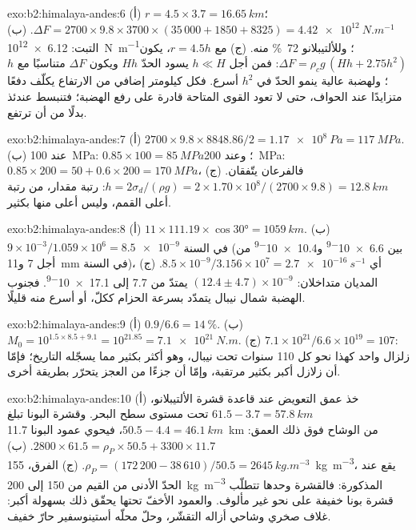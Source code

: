 \begin{solution}{exo:b2:himalaya-andes:6}
(أ) $r = 4.5\times3.7 = \qty{16.65}{km}$؛ $\Delta F = 2700\times9.8\times3700\times(35\,000 +
1850 + 8325) = \qty{4.42e12}{N.m^{-1}}$. (ب) التبت: \qty{6.12e12}{N.m^{-1}}؛ وللألتيبلانو
\qty{72}{\percent} منه. (ج) مع $r = 4.5h$، يكون $\Delta F = \rho_c g\,(Hh + 2.75h^2)$: فمن أجل
$h \ll H$ يسود الحدّ $Hh$ ويكون $\Delta F$ متناسبًا مع $h$؛ ولهضبة عالية
ينمو الحدّ في $h^2$ أسرع. فكل كيلومتر إضافي من الارتفاع يكلّف دفعًا متزايدًا عند
الحواف، حتى لا تعود القوى المتاحة قادرة على رفع الهضبة؛ فتنبسط عندئذ
بدلًا من أن ترتفع.
\end{solution}

\begin{solution}{exo:b2:himalaya-andes:7}
(أ) $2700\times9.8\times8848.86/2 = \qty{1.17e8}{Pa} = \qty{117}{MPa}$. (ب) عند
\qty{100}{MPa}: $0.85\times100 = \qty{85}{MPa}$؛ وعند \qty{200}{MPa}: $0.85\times200 = 50 +
0.6\times200 = \qty{170}{MPa}$، فالفرعان يتّفقان. (ج) $h = 2\sigma_d/(\rho g) =
2\times1.70\times10^8/(2700\times9.8) = \qty{12.8}{km}$: رتبة مقدار، من رتبة
أعلى القمم، وليس أعلى منها بكثير.
\end{solution}

\begin{solution}{exo:b2:himalaya-andes:8}
(أ) $11\times111.19\times\cos\ang{30} = \qty{1059}{km}$. (ب) $9\times10^{-3}/1.059\times10^{6}
= \num{8.5e-9}$ في السنة (بين \num{6.6e-9} و\num{10.4e-9} من أجل 7 و\qty{11}{mm} في السنة)،
أي $8.5\times10^{-9}/3.156\times10^{7} = \qty{2.7e-16}{s^{-1}}$. (ج) المديان
متداخلان: $(12.4 \pm 4.7) \times 10^{-9}$ يمتدّ من 7.7 إلى \num{17.1e-9}. فجنوب الهضبة شمال
نيبال يتمدّد بسرعة الحزام ككلّ، أو أسرع منه قليلًا.
\end{solution}

\begin{solution}{exo:b2:himalaya-andes:9}
(أ) $0.9/6.6 = \qty{14}{\percent}$. (ب) $M_0 = 10^{1.5\times8.5 + 9.1} = 10^{21.85} =
\qty{7.1e21}{N.m}$. (ج) $7.1\times10^{21}/6.6\times10^{19} = 107$: زلزال واحد كهذا نحو
كل 110 سنوات تحت نيبال، وهو أكثر بكثير مما يسجّله التاريخ؛ فإمّا أن زلازل أكبر بكثير
مرتقبة، وإمّا أن جزءًا من العجز يتحرّر بطريقة أخرى.
\end{solution}

\begin{solution}{exo:b2:himalaya-andes:10}
(أ) خذ عمق التعويض عند قاعدة قشرة الألتيبلانو، $61.5 - 3.7 =
\qty{57.8}{km}$ تحت مستوى سطح البحر. وقشرة البونا تبلغ $50.5 - 4.4 = \qty{46.1}{km}$، فيحوي
عمود البونا \qty{11.7}{km} من الوشاح فوق ذلك العمق: $2800\times61.5 =
\rho_P\times50.5 + 3300\times11.7$. (ب) $\rho_P = (172\,200 - 38\,610)/50.5 =
\qty{2645}{kg.m^{-3}}$. (ج) الفرق، \qty{155}{kg.m^{-3}}، يقع عند الحدّ الأدنى من
القيم من 150 إلى \qty{200}{kg.m^{-3}} المذكورة: فالقشرة وحدها تتطلّب قشرة بونا خفيفة على نحو غير مألوف.
والعمود الأخفّ تحتها يحقّق ذلك بسهولة أكبر: غلاف صخري وشاحي أزاله التقشّر،
وحلّ محلّه أستينوسفير حارّ خفيف.
\end{solution}

